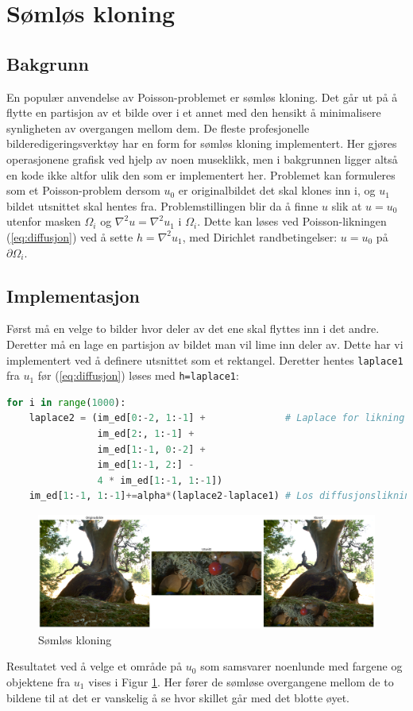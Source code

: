 \newpage
\section{Sømløs kloning}
\label{sec:kloning}
\subsection{Bakgrunn}
En populær anvendelse av Poisson-problemet er sømløs kloning. Det går ut på å flytte en partisjon av et bilde over i et annet med den hensikt å minimalisere synligheten av overgangen mellom dem. De fleste profesjonelle bilderedigeringsverktøy har en form for sømløs kloning implementert. Her gjøres operasjonene grafisk ved hjelp av noen museklikk, men i bakgrunnen ligger altså en kode ikke altfor ulik den som er implementert her.\newline
Problemet kan formuleres som et Poisson-problem dersom $u_0$ er originalbildet det skal klones inn i, og $u_1$ bildet utsnittet skal hentes fra. Problemstillingen blir da å finne $u$ slik at $u=u_0$ utenfor masken $\Omega_i$ og $\nabla^2 u = \nabla^2 u_1$ i $\Omega_i$. Dette kan løses ved Poisson-likningen (\ref{eq:diffusjon}) ved å sette $h=\nabla^2 u_1$, med Dirichlet randbetingelser: $u=u_0$ på $\partial \Omega_i$. 

\subsection{Implementasjon}
Først må en velge to bilder hvor deler av det ene skal flyttes inn i det andre. Deretter må en lage en partisjon av bildet man vil lime inn deler av. Dette har vi implementert ved å definere utsnittet som et rektangel. Deretter hentes \texttt{laplace1} fra $u_1$ før (\ref{eq:diffusjon}) løses med \texttt{h=laplace1}:

\begin{lstlisting}[language=Python]
for i in range(1000):
    laplace2 = (im_ed[0:-2, 1:-1] +              # Laplace for likning 2
                im_ed[2:, 1:-1] +    
                im_ed[1:-1, 0:-2] +
                im_ed[1:-1, 2:] -
                4 * im_ed[1:-1, 1:-1])
    im_ed[1:-1, 1:-1]+=alpha*(laplace2-laplace1) # Los diffusjonslikningen
\end{lstlisting}

\begin{figure}
\begin{center}
    \includegraphics[width=1\columnwidth]{bilder/kloning.png}
    \caption{Sømløs kloning
    \label{fig:seamless}} 
\end{center}
\end{figure}

Resultatet ved å velge et område på $u_0$ som samsvarer noenlunde med fargene og objektene fra $u_1$ vises i Figur \ref{fig:seamless}. Her fører de sømløse overgangene mellom de to bildene til at det er vanskelig å se hvor skillet går med det blotte øyet. 